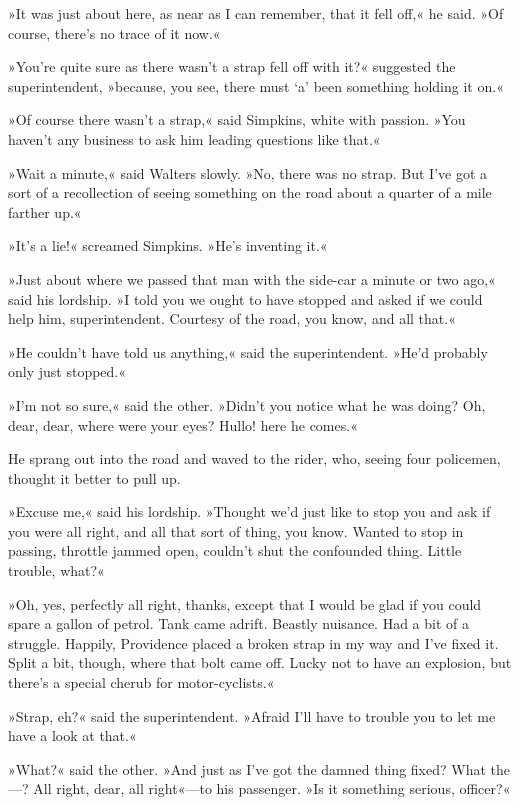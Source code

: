 »It was just about here, as near as I can remember, that it fell off,« he said. »Of course, there's no trace of it now.«

»You're quite sure as there wasn't a strap fell off with it?« suggested the superintendent, »because, you see, there must `a' been something holding it on.«

»Of course there wasn't a strap,« said Simpkins, white with passion. »You haven't any business to ask him leading questions like that.«

»Wait a minute,« said Walters slowly. »No, there was no strap. But I've got a sort of a recollection of seeing something on the road about a quarter of a mile farther up.«

»It's a lie!« screamed Simpkins. »He's inventing it.«

»Just about where we passed that man with the side-car a minute or two ago,« said his lordship. »I told you we ought to have stopped and asked if we could help him, superintendent. Courtesy of the road, you know, and all that.«

»He couldn't have told us anything,« said the superintendent. »He'd probably only just stopped.«

»I'm not so sure,« said the other. »Didn't you notice what he was doing? Oh, dear, dear, where were your eyes? Hullo! here he comes.«

He sprang out into the road and waved to the rider, who, seeing four policemen, thought it better to pull up.

»Excuse me,« said his lordship. »Thought we'd just like to stop you and ask if you were all right, and all that sort of thing, you know. Wanted to stop in passing, throttle jammed open, couldn't shut the confounded thing. Little trouble, what?«

»Oh, yes, perfectly all right, thanks, except that I would be glad if you could spare a gallon of petrol. Tank came adrift. Beastly nuisance. Had a bit of a struggle. Happily, Providence placed a broken strap in my way and I've fixed it. Split a bit, though, where that bolt came off. Lucky not to have an explosion, but there's a special cherub for motor-cyclists.«

»Strap, eh?« said the superintendent. »Afraid I'll have to trouble you to let me have a look at that.«

»What?« said the other. »And just as I've got the damned thing fixed? What the—? All right, dear, all right«—to his passenger. »Is it something serious, officer?«

